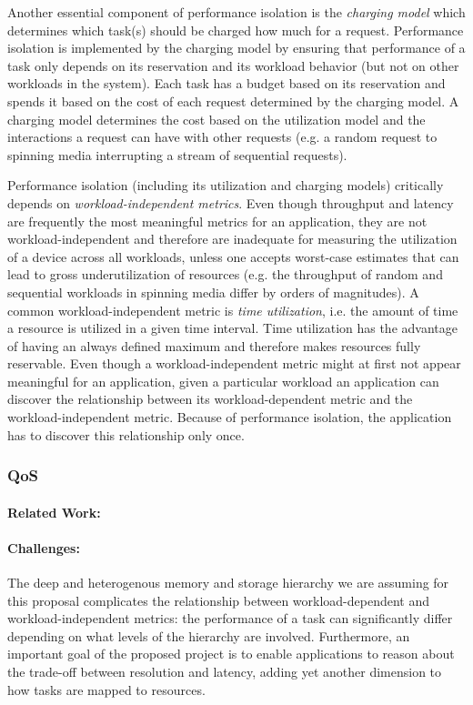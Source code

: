 Another essential component of performance isolation is the
\emph{charging model} which determines which task(s) should be
charged how much for a request. Performance isolation is implemented
by the charging model by ensuring that performance of a task only
depends on its reservation and its workload behavior (but not on
other workloads in the system). Each task has a budget based on its
reservation and spends it based on the cost of each request determined
by the charging model. A charging model determines the cost based
on the utilization model and the interactions a request can have
with other requests (e.g. a random request to spinning media
interrupting a stream of sequential requests).

Performance isolation (including its utilization and charging models)
critically depends on \emph{workload-independent metrics}. Even
though throughput and latency are frequently the most meaningful
metrics for an application, they are not workload-independent and
therefore are inadequate for measuring the utilization of a device
across all workloads, unless one accepts worst-case estimates that
can lead to gross underutilization of resources (e.g. the throughput
of random and sequential workloads in spinning media differ by
orders of magnitudes). A common workload-independent metric is
\emph{time utilization}, i.e. the amount of time a resource is
utilized in a given time interval. Time utilization has the advantage
of having an always defined maximum and therefore makes resources
fully reservable. Even though a workload-independent metric might
at first not appear meaningful for an application, given a particular
workload an application can discover the relationship between its
workload-dependent metric and the workload-independent metric.
Because of performance isolation, the application has to discover
this relationship only once.



\subsubsection{QoS}


\paragraph{Related Work:}

\paragraph{Challenges:} The deep and heterogenous memory and storage
hierarchy we are assuming for this proposal complicates the
relationship between workload-dependent and workload-independent
metrics: the performance of a task can significantly differ depending
on what levels of the hierarchy are involved. Furthermore, an
important goal of the proposed project is to enable applications
to reason about the trade-off between resolution and latency, adding
yet another dimension to how tasks are mapped to resources.

